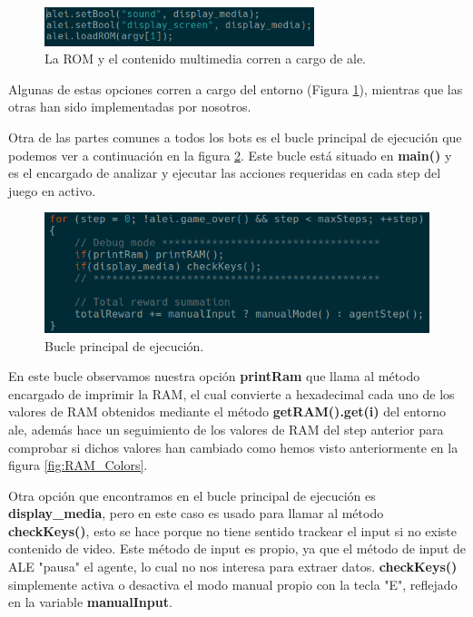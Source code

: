 \begin{figure}[h]
	\centering
	\includegraphics[width=0.7\textwidth]{Figures/ALEromANDmedia}
	\caption{La ROM y el contenido multimedia corren a cargo de \ac{ale}.}
	\label{fig:ALEromANDmedia}
\end{figure}

\newpage
Algunas de estas opciones corren a cargo del entorno (Figura 	\ref{fig:ALEromANDmedia}), mientras que las otras han sido implementadas por nosotros.

Otra de las partes comunes a todos los bots es el bucle principal de ejecución que podemos ver a continuación en la figura \ref{fig:ALEMainExecLoop}. Este bucle está situado en \textbf{main()} y es el encargado de analizar y ejecutar las acciones requeridas en cada step del juego en activo.

\begin{figure}[h]
	\centering
	\includegraphics[width=1\textwidth]{Figures/ALEMainExecLoop}
	\caption{Bucle principal de ejecución.}
	\label{fig:ALEMainExecLoop}
\end{figure}

En este bucle observamos nuestra opción \textbf{printRam} que llama al método encargado de imprimir la RAM, el cual convierte a hexadecimal cada uno de los valores de RAM obtenidos mediante el método \textbf{getRAM().get(i)} del entorno \ac{ale}, además hace un seguimiento de los valores de RAM del step anterior para comprobar si dichos valores han cambiado como hemos visto anteriormente en la figura \ref{fig:RAM_Colors}.

Otra opción que encontramos en el bucle principal de ejecución es \textbf{display\_media}, pero en este caso es usado para llamar al método \textbf{checkKeys()}, esto se hace porque no tiene sentido trackear el input si no existe contenido de video. Este método de input es propio, ya que el método de input de ALE "pausa" el agente, lo cual no nos interesa para extraer datos. \textbf{checkKeys()} simplemente activa o desactiva el modo manual propio con la tecla "E", reflejado en la variable \textbf{manualInput}.

